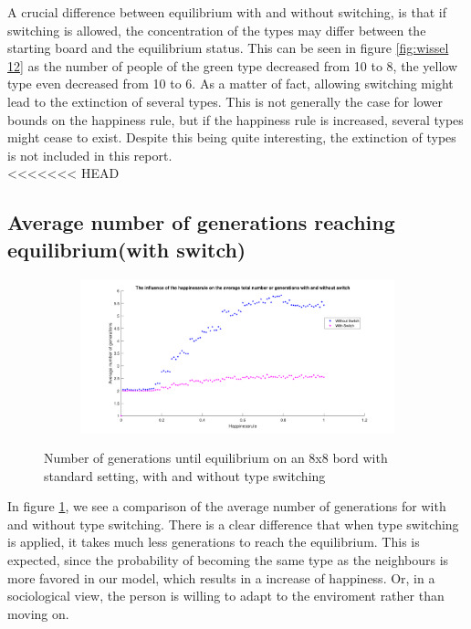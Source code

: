 A crucial difference between equilibrium with and without switching, is that if switching is allowed, the concentration of the types may differ between the starting board and the equilibrium status. 
This can be seen in figure \ref{fig:wissel 12} as the number of people of the green type decreased from 10 to 8, the yellow type even decreased from 10 to 6. 
As a matter of fact, allowing switching might lead to the extinction of several types. 
This is not generally the case for lower bounds on the happiness rule, but if the happiness rule is increased, several types might cease to exist. Despite this being quite interesting, the extinction of types is not included in this report.\\
<<<<<<< HEAD
\subsection{Average number of generations reaching equilibrium(with switch)}
\begin{figure}[H]
	\centering
    \begin{subfigure}{0.9\textwidth}
        \includegraphics[width=\textwidth]{happinessrule-totaantgenwithswitchorwithoutswitch}
    \end{subfigure}
    \caption{Number of generations until equilibrium on an 8x8 bord with standard setting, with and without type switching}
    \label{fig:AantGenS}
\end{figure}
In figure \ref{fig:AantGenS}, we see a comparison of the average number of generations for with and without type switching. There is a clear difference that when type switching is applied, it takes much less generations to reach the equilibrium. This is expected, since the probability of becoming the same type as the neighbours is more favored in our model, which results in a increase of happiness. Or, in a sociological view, the person is willing to adapt to the enviroment rather than moving on.\\

